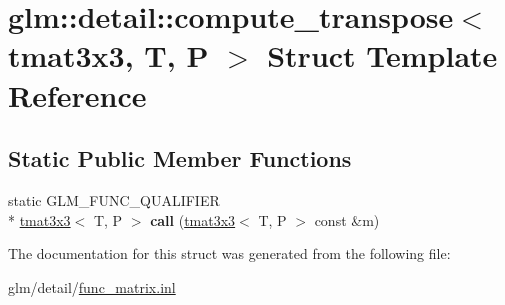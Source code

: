 \hypertarget{structglm_1_1detail_1_1compute__transpose_3_01tmat3x3_00_01T_00_01P_01_4}{\section{glm\-:\-:detail\-:\-:compute\-\_\-transpose$<$ tmat3x3, T, P $>$ Struct Template Reference}
\label{structglm_1_1detail_1_1compute__transpose_3_01tmat3x3_00_01T_00_01P_01_4}
}
\subsection*{Static Public Member Functions}
\begin{DoxyCompactItemize}
\item 
\hypertarget{structglm_1_1detail_1_1compute__transpose_3_01tmat3x3_00_01T_00_01P_01_4_ac265563c5d676e2e529371d72ee11db5}{static G\-L\-M\-\_\-\-F\-U\-N\-C\-\_\-\-Q\-U\-A\-L\-I\-F\-I\-E\-R \\*
\hyperlink{structglm_1_1tmat3x3}{tmat3x3}$<$ T, P $>$ {\bfseries call} (\hyperlink{structglm_1_1tmat3x3}{tmat3x3}$<$ T, P $>$ const \&m)}\label{structglm_1_1detail_1_1compute__transpose_3_01tmat3x3_00_01T_00_01P_01_4_ac265563c5d676e2e529371d72ee11db5}

\end{DoxyCompactItemize}


The documentation for this struct was generated from the following file\-:\begin{DoxyCompactItemize}
\item 
glm/detail/\hyperlink{func__matrix_8inl}{func\-\_\-matrix.\-inl}\end{DoxyCompactItemize}
